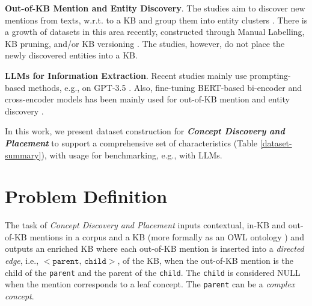 \documentclass[sigconf]{acmart}
\begin{document}
\noindent\textbf{Out-of-KB Mention and Entity Discovery}. The studies aim to discover new mentions from texts, w.r.t. to a KB \cite{dong2023NIL,suominen2013shareclef} and group them into entity clusters \cite{Iurshina2022nilk,kassner2022edin,rizzo2017NEEL,ji2011TAC}. There is a growth of datasets in this area recently, constructed through Manual Labelling, KB pruning, and/or KB versioning \cite{dong2023NIL}. The studies, however, do not place the newly discovered entities into a KB. 

\noindent\textbf{LLMs for Information Extraction}. Recent studies mainly use prompting-based methods, e.g., on GPT-3.5 \cite{HarryCaufield2023ontogpt}. Also, fine-tuning BERT-based bi-encoder and cross-encoder models has been mainly used for out-of-KB mention and entity discovery \cite{dong2023NIL,heist2023nastylinker,kassner2022edin}.

In this work, we present dataset construction for \textit{\textbf{Concept Discovery and Placement}} to support a comprehensive set of characteristics (Table \ref{dataset-summary}), with usage for benchmarking, e.g., with LLMs.

\section{Problem Definition}

The task of \textit{Concept Discovery and Placement} inputs contextual, in-KB and out-of-KB mentions in a corpus and a KB (more formally as an OWL ontology \cite{GRAU2008OWL2,baader_horrocks_lutz_sattler_2017chap8}) and outputs an enriched KB where each out-of-KB mention is inserted into a \textit{directed edge}, i.e., $<\texttt{parent, child}>$, of the KB, when the out-of-KB mention is the child of the \texttt{parent} and the parent of the \texttt{child}. The \texttt{child} is considered NULL when the mention corresponds to a leaf concept. The \texttt{parent} can be a \textit{complex concept}. 
\end{document}

